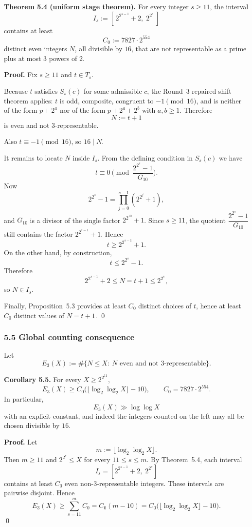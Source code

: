 \textbf{Theorem 5.4 (uniform stage theorem).}
For every integer $s\ge 11$, the interval
\[
I_s:=[\,2^{2^{s-1}}+2,\;2^{2^s}\,]
\]
contains at least
\[
C_0:=7827\cdot 2^{554}
\]
distinct even integers $N$, all divisible by $16$, that are not representable as a prime plus at most $3$ powers of $2$.

\textbf{Proof.}
Fix $s\ge 11$ and $t\in T_s$.

Because $t$ satisfies $S_s(c)$ for some admissible $c$, the Round~3 repaired shift theorem applies: $t$ is odd, composite, congruent to $-1\pmod{16}$, and is neither of the form $p+2^a$ nor of the form $p+2^a+2^b$ with $a,b\ge 1$. Therefore
\[
N:=t+1
\]
is even and not $3$-representable.

Also $t\equiv -1\pmod{16}$, so $16\mid N$.

It remains to locate $N$ inside $I_s$.
From the defining condition in $S_s(c)$ we have
\[
t\equiv 0\pmod{\frac{2^{2^s}-1}{G_{10}}}.
\]
Now
\[
2^{2^s}-1=\prod_{j=0}^{s-1}(2^{2^j}+1),
\]
and $G_{10}$ is a divisor of the single factor $2^{2^{10}}+1$.
Since $s\ge 11$, the quotient $\dfrac{2^{2^s}-1}{G_{10}}$ still contains the factor $2^{2^{s-1}}+1$.
Hence
\[
t\ge 2^{2^{s-1}}+1.
\]
On the other hand, by construction,
\[
t\le 2^{2^s}-1.
\]
Therefore
\[
2^{2^{s-1}}+2\le N=t+1\le 2^{2^s},
\]
so $N\in I_s$.

Finally, Proposition~5.3 provides at least $C_0$ distinct choices of $t$, hence at least $C_0$ distinct values of $N=t+1$.
\qed

\subsubsection{5.5 Global counting consequence}

Let
\[
E_3(X):=\#\{N\le X:\ N\text{ even and not }3\text{-representable}\}.
\]

\textbf{Corollary 5.5.}
For every $X\ge 2^{2^{11}}$,
\[
E_3(X)\ge C_0\bigl(\lfloor \log_2\log_2 X\rfloor-10\bigr),
\qquad C_0=7827\cdot 2^{554}.
\]
In particular,
\[
E_3(X)\gg \log\log X
\]
with an explicit constant, and indeed the integers counted on the left may all be chosen divisible by $16$.

\textbf{Proof.}
Let
\[
m:=\lfloor \log_2\log_2 X\rfloor.
\]
Then $m\ge 11$ and $2^{2^s}\le X$ for every $11\le s\le m$.
By Theorem~5.4, each interval
\[
I_s=[2^{2^{s-1}}+2,\;2^{2^s}]
\]
contains at least $C_0$ even non-$3$-representable integers.
These intervals are pairwise disjoint.
Hence
\[
E_3(X)\ge \sum_{s=11}^{m} C_0 = C_0(m-10)
= C_0\bigl(\lfloor \log_2\log_2 X\rfloor-10\bigr).
\]
\qed

